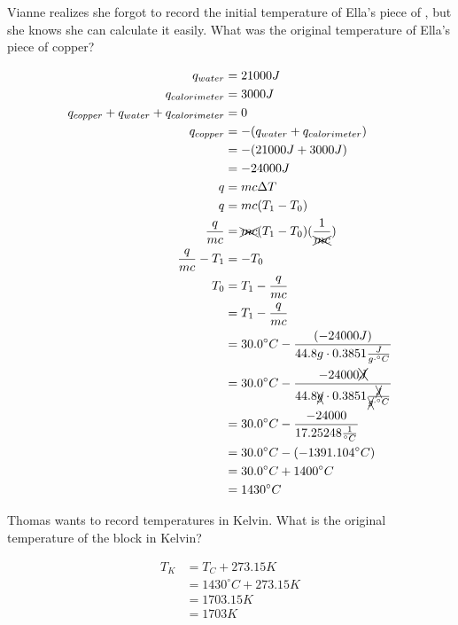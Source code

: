 \documentclass[11pt,addpoints]{exam}   	%
\begin{document}
\begin{questions}
\question[5] Vianne realizes she forgot to record the initial temperature of Ella's piece of , but she knows she can calculate it easily. What was the original temperature of Ella's piece of copper?
\begin{solution}
\begin{equation} 
\begin{split}
   q_{water} &= 21000 J\\
   q_{calorimeter} &= 3000 J\\
   q_{copper} + q_{water} + q_{calorimeter} &= 0 \\
   q_{copper} &= - (q_{water} + q_{calorimeter} )\\
                      &= - (21000 J + 3000 J) \\
                      &= -24000 J\\
   q &= m c \Delta T \\
   q &= m c (T_1 - T_0) \\
   \frac{q}{m c} &= \xcancel{m c} (T_1 - T_0) ( \frac{1}{\xcancel{m c}} ) \\
   \frac{q}{m c} - T_1 &= - T_0 \\
   T_0 &= T_1 - \frac{q}{m c} \\
           &= T_1 - \frac{ q } {m c} \\
           &= 30.0^{\circ}C - \frac{ (-24000 J) }{44.8g \cdot  0.3851 \frac{J}{g \cdot ^{\circ} C}} \\     
           &= 30.0^{\circ}C - \frac{ -24000 \xcancel{J} }{44.8 \xcancel{g} \cdot  0.3851 \frac{\xcancel{J}}{\xcancel{g} \cdot ^{\circ} C}} \\     
           &= 30.0^{\circ}C - \frac{ -24000 } {17.25248  \frac{1}{ ^{\circ} C}} \\ 
           &= 30.0^{\circ}C - (- 1391.104 ^{\circ} C)\\
           &= 30.0^{\circ}C + 1400 ^{\circ} C\\
           &= 1430 ^{\circ} C 
 \end{split}
 \end{equation}
 \end{solution}

\question[5] Thomas wants to record temperatures in Kelvin. What is the original temperature of the  block in Kelvin?
\begin{solution}
\begin{equation} 
\begin{split}
    T_K &= T_C + 273.15 K \\
            &= 1430^{\circ}C + 273.15 K \\
            &= 1703.15 K \\
            &= 1703 K                                       
 \end{split}
 \end{equation}
 \end{solution}
 

\end{questions}
\end{document}

